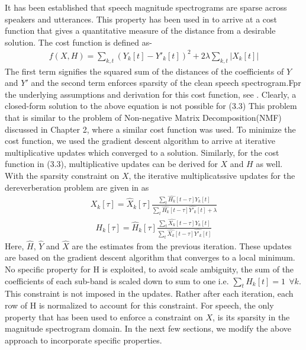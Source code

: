 \documentclass[12pt, a4paper, oneside]{book}
\begin{document}
It has been established that speech magnitude spectrograms are sparse across speakers and utterances. This property has been used in \cite{naka} \cite{moham}\cite{gamma} to arrive at a cost function that gives a quantitative measure of the distance from a desirable solution. The cost function is defined as- 
\begin{align} f(X,H) = \sum_{k,t} (Y_k[t] - Y'_k[t])^2 + 2 \lambda \sum_{k,t} |X_k[t]| \label{cost}
\end{align}
The first term signifies the squared sum of the distances of the coefficients of $Y$ and $Y'$ and the second term enforces sparsity of the clean speech spectrogram.Fpr the underlying assumptions and derivation for this cost function, see \cite{naka}. Clearly, a closed-form solution to the above equation is not possible for (3.3) This problem that is similar to the problem of Non-negative Matrix Decomposition(NMF) discussed in Chapter 2, where a similar cost function was used. To minimize the cost function, we used the gradient descent algorithm to arrive at iterative multiplicative updates which converged to a solution. Similarly, for the cost function in (3.3), multiplicative updates can be derived for $X$ and $H$ as well. With the sparsity constraint on $X$, the iterative multiplicatssive updates for the dereverberation problem are given in \cite{naka} as 
\begin{align}X_k[\tau] = \hat{X}_k[\tau]\frac{\sum_{t}\hat{H_k}[t-\tau]Y_k[t]}{\sum_{t}\hat{H_k}[t-\tau]\hat{Y'_k}[t] + \lambda} \label{X update}
\end{align}
\begin{align} H_k[\tau] = \hat{H}_k[\tau]\frac{\sum_{t}\hat{X_k}[t-\tau]Y_k[t]}{\sum_{t}\hat{X_k}[t-\tau]\hat{Y'_k}[t]} \label{H update}
\end{align}
Here, $\hat{H}$, $\hat{Y}$ and $\hat{X}$ are the estimates from the previous iteration. These updates are based on the gradient descent algorithm that converges to a local minimum. No specific property for H is exploited, to avoid scale ambiguity, the sum of the coefficients of each sub-band is scaled down to sum to one i.e. $\sum_{t}H_k[t] = 1 \ \ \forall k$. This constraint is not imposed in the updates. Rather after each iteration, each row of H is normalized to account for this constraint. For speech, the only property that has been used to enforce a constraint on $X$, is its sparsity in the magnitude spectrogram domain. In the next few sections, we modify the above approach to incorporate specific properties.
\end{document}
